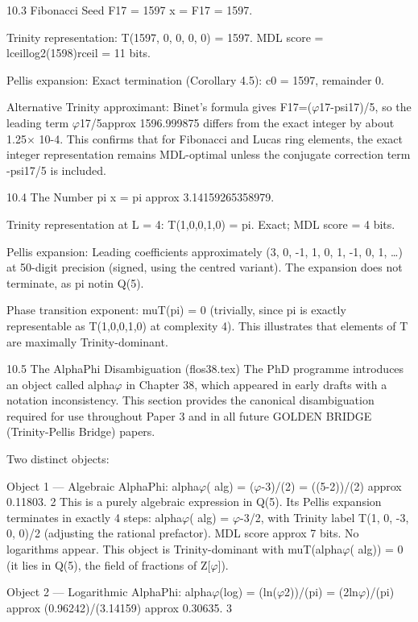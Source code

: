   10.3 Fibonacci Seed F17 = 1597
  x = F17 = 1597.

  Trinity representation: T(1597, 0, 0, 0, 0) = 1597. MDL score = lceillog2(1598)rceil =
  11 bits.

  Pellis expansion: Exact termination (Corollary 4.5): c0 = 1597, remainder 0.

  Alternative Trinity approximant: Binet's formula gives F17=($\varphi$17-psi17)/5, so the
  leading term $\varphi$17/5approx 1596.999875 differs from the exact integer by about 1.25$\times$
  10-4. This confirms that for Fibonacci and Lucas ring elements, the exact integer
  representation remains MDL-optimal unless the conjugate correction term -psi17/5 is
  included.

  10.4 The Number pi
  x = pi approx 3.14159265358979.

  Trinity representation at L = 4: T(1,0,0,1,0) = pi. Exact; MDL score = 4 bits.

  Pellis expansion: Leading coefficients approximately (3, 0, -1, 1, 0, 1, -1, 0, 1, …) at
  50-digit precision (signed, using the centred variant). The expansion does not
  terminate, as pi notin Q(5).

  Phase transition exponent: muT(pi) = 0 (trivially, since pi is exactly representable as
  T(1,0,0,1,0) at complexity 4). This illustrates that elements of T are maximally
  Trinity-dominant.

  10.5 The AlphaPhi Disambiguation (flos38.tex)
  The PhD programme introduces an object called alpha$\varphi$ in Chapter 38, which appeared
  in early drafts with a notation inconsistency. This section provides the canonical
  disambiguation required for use throughout Paper 3 and in all future GOLDEN BRIDGE (Trinity-Pellis Bridge)
  papers.

  Two distinct objects:

  Object 1 --- Algebraic AlphaPhi:
  alpha$\varphi$( alg) = ($\varphi$-3)/(2) = ((5-2))/(2) approx 0.11803. 2
  This is a purely algebraic expression in Q(5). Its Pellis expansion terminates in exactly 4
  steps: alpha$\varphi$( alg) = $\varphi$-3/2, with Trinity label T(1, 0, -3, 0, 0)/2 (adjusting the rational
  prefactor). MDL score approx 7 bits. No logarithms appear. This object is
  Trinity-dominant with muT(alpha$\varphi$( alg)) = 0 (it lies in Q(5), the field of fractions of
  Z[$\varphi$]).

  Object 2 --- Logarithmic AlphaPhi:
  alpha$\varphi$(log) = (ln($\varphi$2))/(pi) = (2ln$\varphi$)/(pi) approx (0.96242)/(3.14159) approx 0.30635. 3

